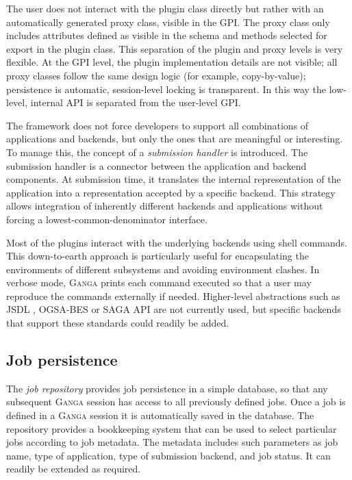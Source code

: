 \documentclass{elsart}
\def\ganga {\textsc{Ganga}\xspace}
\def\GPI{GPI\xspace}
\newcommand{\qq}[1]{#1}
\begin{document}
\begin{linenumbers}
The user does not interact with the plugin class directly but rather with an
automatically generated proxy class, visible in the \GPI. The proxy
class only includes attributes defined as visible in the schema and methods
selected for export in the plugin class. This separation of the plugin and
proxy levels is very flexible. At the \GPI level, the plugin implementation
details are not visible; all proxy classes follow the same design logic (for
example, copy-by-value); persistence is automatic, session-level locking
is transparent. In this way the low-level, internal API is
separated from the user-level \GPI.

The framework does not force developers to support all combinations of
applications and backends, but only the ones that are meaningful or interesting. To manage
this, the concept of a {\em submission handler} is introduced. The submission
handler is a connector between the application and backend components. At
submission time, it translates the internal representation of the application
into a representation accepted by a specific backend. This strategy allows
integration of inherently different backends and applications without forcing
a lowest-common-denominator interface.

\qq{
Most of the plugins interact with the underlying backends using shell
commands. This down-to-earth approach is particularly useful for
encapsulating the environments of different subsystems and avoiding
environment clashes. In verbose mode, \ganga prints each command
executed so that a user may reproduce the commands externally if
needed. Higher-level abstractions such as JSDL \cite{JSDL},
OGSA-BES \cite{OGSA-BES} or SAGA API \cite{SAGA} are not currently
used, but specific backends that support these standards could readily
be added.
}

\subsection{Job persistence}
\label{sec:persistence}
The \emph{job repository} provides job persistence in a simple database,
so that any subsequent \ganga session has access to all previously
defined jobs. Once a job is defined in a \ganga session it is automatically
saved in the database. The repository provides a bookkeeping system that can
be used to select particular jobs according to job metadata. The metadata
includes such parameters as job name, type of application, type of submission
backend, and job status. It can readily be extended as required.


\end{linenumbers}
\end{document}
